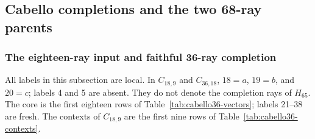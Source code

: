 \documentclass[aps,pra,reprint,superscriptaddress,longbibliography,nofootinbib,floatfix,10pt]{revtex4-2}
\theoremstyle{definition}
\begin{document}
\subsection{Cabello completions and the two 68-ray parents}
\subsubsection{The eighteen-ray input and faithful 36-ray completion}
\label{app:cabello-vectors}
All labels in this subsection are local. In $C_{18,9}$ and $C_{36,18}$,
$18=a$, $19=b$, and $20=c$; labels 4 and 5 are absent. They do not denote
the completion rays of $H_{65}$. The core is the first eighteen rows
of Table~\ref{tab:cabello36-vectors}; labels 21--38 are fresh.
The contexts of $C_{18,9}$ are the first nine rows of
Table~\ref{tab:cabello36-contexts}.
\begingroup\small
{}
\end{document}
